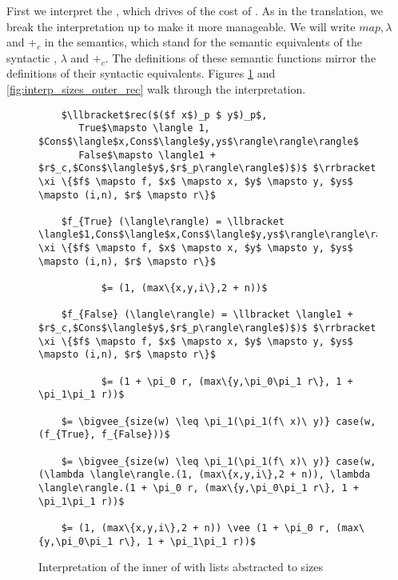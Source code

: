 First we interpret the , which drives of the cost of .  As in
the translation, we break the interpretation up to make it more manageable.  We
will write $map, \lambda$ and $+_c$ in the semantics, which stand for the
semantic equivalents of the syntactic , $\lambda$ and $+_c$.  The
definitions of these semantic functions mirror the definitions of their
syntactic equivalents.  Figures \ref{fig:interp_sizes_inner_rec} and
\ref{fig:interp_sizes_outer_rec} walk through the interpretation.
%
\begin{figure}[H]
  \caption{Interpretation of the inner  of  with lists abstracted to sizes}
  \label{fig:interp_sizes_inner_rec}
  \begin{lstlisting}
    $\llbracket$rec($($f x$)_p $ y$)_p$,
       True$\mapsto \langle 1, $Cons$\langle$x,Cons$\langle$y,ys$\rangle\rangle\rangle$
       False$\mapsto \langle1 + $r$_c,$Cons$\langle$y$,$r$_p\rangle\rangle$)$)$ $\rrbracket \xi \{$f$ \mapsto f, $x$ \mapsto x, $y$ \mapsto y, $ys$ \mapsto (i,n), $r$ \mapsto r\}$

    $f_{True} (\langle\rangle) = \llbracket \langle$1,Cons$\langle$x,Cons$\langle$y,ys$\rangle\rangle\rangle\rrbracket \xi \{$f$ \mapsto f, $x$ \mapsto x, $y$ \mapsto y, $ys$ \mapsto (i,n), $r$ \mapsto r\}$

           $= (1, (max\{x,y,i\},2 + n))$

    $f_{False} (\langle\rangle) = \llbracket \langle1 + $r$_c,$Cons$\langle$y$,$r$_p\rangle\rangle$)$)$ $\rrbracket \xi \{$f$ \mapsto f, $x$ \mapsto x, $y$ \mapsto y, $ys$ \mapsto (i,n), $r$ \mapsto r\}$

           $= (1 + \pi_0 r, (max\{y,\pi_0\pi_1 r\}, 1 + \pi_1\pi_1 r))$
    
    $= \bigvee_{size(w) \leq \pi_1(\pi_1(f\ x)\ y)} case(w, (f_{True}, f_{False}))$

    $= \bigvee_{size(w) \leq \pi_1(\pi_1(f\ x)\ y)} case(w, (\lambda \langle\rangle.(1, (max\{x,y,i\},2 + n)), \lambda \langle\rangle.(1 + \pi_0 r, (max\{y,\pi_0\pi_1 r\}, 1 + \pi_1\pi_1 r))$

    $= (1, (max\{x,y,i\},2 + n)) \vee (1 + \pi_0 r, (max\{y,\pi_0\pi_1 r\}, 1 + \pi_1\pi_1 r))$
  \end{lstlisting}
\end{figure}
%
